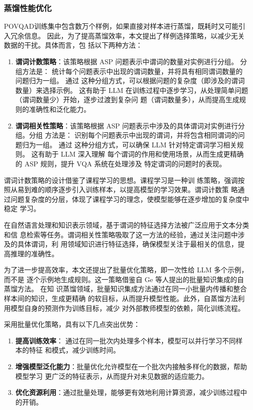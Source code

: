 \subsubsection{蒸馏性能优化}
POVQAD训练集中包含数万个样例，如果直接对样本进行蒸馏，既耗时又可能引入冗余信息。
因此，为了提高蒸馏效率，本文提出了样例选择策略，以减少无关数据的干扰。具体而言，包
括以下两种方法：
\begin{enumerate}[nosep]
\item \textbf{谓词计数策略}：该策略根据 ASP 问题表示中谓词的数量对实例进行分组。 分组方法是：
统计每个问题表示中出现的谓词数量，并将具有相同谓词数量的问题归为一组。 通过
这种分组方式，可以根据问题的复杂度（即涉及的谓词数量）来选择示例。 这有助于
LLM 在训练过程中逐步学习，从处理简单问题（谓词数量少）开始，逐步过渡到复杂问
题（谓词数量多），从而提高生成规则的准确性和泛化能力。
\item \textbf{谓词相关性策略}：该策略根据 ASP 问题表示中涉及的具体谓词对实例进行分组。分组
方法是： 识别每个问题表示中出现的谓词，并将包含相同谓词的问题归为一组。 通过
这种分组方式，可以确保 LLM 针对特定谓词学习相关规则。 这有助于 LLM 深入理解
每个谓词的作用和使用场景，从而生成更精确的 ASP 规则，提升 VQA 系统在处理涉及
特定谓词的问题时的表现。
\end{enumerate}

谓词计数策略的设计借鉴了课程学习的思想。课程学习是一种训
练策略，强调按照从易到难的顺序逐步引入训练样本，以提高模型的学习效果。谓词计数策
略通过问题复杂度的分层，体现了课程学习的理念，使模型能够在逐步增加的复杂度中稳定
学习。

在自然语言处理和知识表示领域，基于谓词的特征选择方法被广泛应用于文本分类和信
息检索等任务。谓词相关性策略吸取了这一方法的经验，通过关注问题中涉及的具体谓词，利
用领域知识进行特征选择，确保模型关注于最相关的信息，提高推理的准确性。

为了进一步提高效率，本文还提出了批量优化策略，即一次性给 LLM 多个示例，而不是
逐个示例地生成规则。这一策略借鉴自 Ge\cite{ge2021selfdistillationbatchknowledgeensembling} 等人提出的批量知识集成的自蒸馏方法。 在知
识蒸馏领域，批量知识集成方法通过在同一小批量内传播和整合样本间的知识，生成更精确
的软目标，从而提升模型性能。此外，自蒸馏方法利用模型自身的预测作为训练目标，减少
对外部教师模型的依赖，简化训练流程。

采用批量优化策略，具有以下几点突出优势：
\begin{enumerate}[nosep]
\item \textbf{提高训练效率}： 通过在同一批次内处理多个样本，模型可以并行学习不同样本的特征
和模式，减少训练时间。
\item \textbf{增强模型泛化能力}：批量优化允许模型在一个批次内接触多样化的数据，帮助模型学习
更广泛的特征表示，从而提升对未见数据的适应能力。
\item \textbf{优化资源利用}：通过批量处理，能够更有效地利用计算资源，减少训练过程中的开销。
\end{enumerate}

